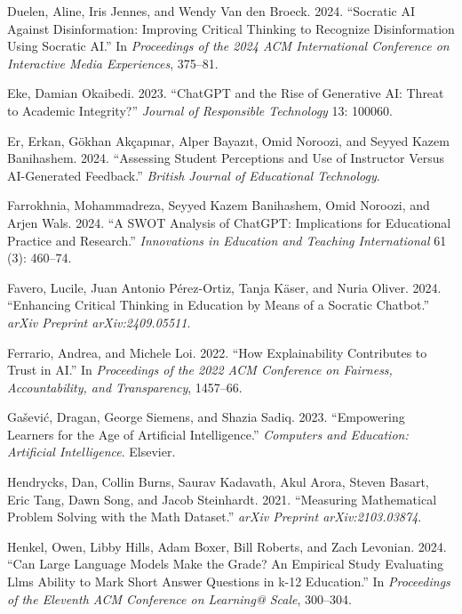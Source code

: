 \documentclass[
  12pt,
]{article}
\newlength{\cslhangindent}
\newenvironment{CSLReferences}[2] %
 {\begin{list}{}{%
  \setlength{\itemindent}{0pt}
  \setlength{\leftmargin}{0pt}
  \setlength{\parsep}{0pt}
  \ifodd #1
   \setlength{\leftmargin}{\cslhangindent}
   \setlength{\itemindent}{-1\cslhangindent}
  \fi
  \setlength{\itemsep}{#2\baselineskip}}}
 {\end{list}}
\begin{document}
\begin{CSLReferences}{1}{0}
Duelen, Aline, Iris Jennes, and Wendy Van den Broeck. 2024. {``Socratic AI Against Disinformation: Improving Critical Thinking to Recognize Disinformation Using Socratic AI.''} In \emph{Proceedings of the 2024 ACM International Conference on Interactive Media Experiences}, 375--81.

Eke, Damian Okaibedi. 2023. {``ChatGPT and the Rise of Generative AI: Threat to Academic Integrity?''} \emph{Journal of Responsible Technology} 13: 100060.

Er, Erkan, Gökhan Akçapınar, Alper Bayazıt, Omid Noroozi, and Seyyed Kazem Banihashem. 2024. {``Assessing Student Perceptions and Use of Instructor Versus AI-Generated Feedback.''} \emph{British Journal of Educational Technology}.

Farrokhnia, Mohammadreza, Seyyed Kazem Banihashem, Omid Noroozi, and Arjen Wals. 2024. {``A SWOT Analysis of ChatGPT: Implications for Educational Practice and Research.''} \emph{Innovations in Education and Teaching International} 61 (3): 460--74.

Favero, Lucile, Juan Antonio Pérez-Ortiz, Tanja Käser, and Nuria Oliver. 2024. {``Enhancing Critical Thinking in Education by Means of a Socratic Chatbot.''} \emph{arXiv Preprint arXiv:2409.05511}.

Ferrario, Andrea, and Michele Loi. 2022. {``How Explainability Contributes to Trust in AI.''} In \emph{Proceedings of the 2022 ACM Conference on Fairness, Accountability, and Transparency}, 1457--66.

Gašević, Dragan, George Siemens, and Shazia Sadiq. 2023. {``Empowering Learners for the Age of Artificial Intelligence.''} \emph{Computers and Education: Artificial Intelligence}. Elsevier.

Hendrycks, Dan, Collin Burns, Saurav Kadavath, Akul Arora, Steven Basart, Eric Tang, Dawn Song, and Jacob Steinhardt. 2021. {``Measuring Mathematical Problem Solving with the Math Dataset.''} \emph{arXiv Preprint arXiv:2103.03874}.

Henkel, Owen, Libby Hills, Adam Boxer, Bill Roberts, and Zach Levonian. 2024. {``Can Large Language Models Make the Grade? An Empirical Study Evaluating Llms Ability to Mark Short Answer Questions in k-12 Education.''} In \emph{Proceedings of the Eleventh ACM Conference on Learning@ Scale}, 300--304.


\end{CSLReferences}
\end{document}
